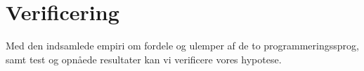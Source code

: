 \documentclass[class=report, crop=false]{standalone}
\begin{document}
    \section{Verificering}
    Med den indsamlede empiri om fordele og ulemper af de to programmeringssprog, samt test og opnåede resultater kan vi verificere vores hypotese.
\end{document}
